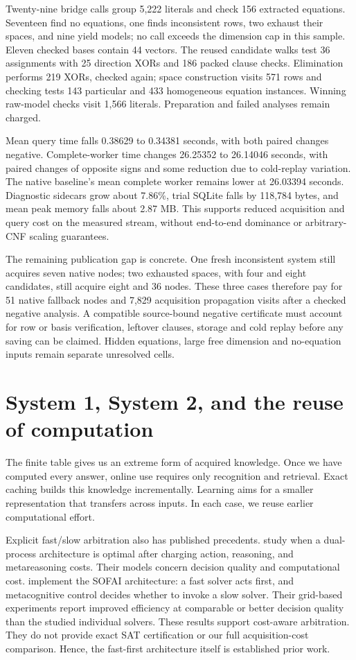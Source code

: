 \documentclass[11pt,a4paper]{article}
\numberwithin{equation}{section}
\theoremstyle{plain}
\theoremstyle{definition}
\theoremstyle{remark}
\begin{document}
Twenty-nine bridge calls group 5,222 literals and check 156 extracted equations.
Seventeen find no equations, one finds inconsistent rows, two exhaust their
spaces, and nine yield models; no call exceeds the dimension cap in this sample.
Eleven checked bases contain 44 vectors. The reused candidate walks test 36
assignments with 25 direction XORs and 186 packed clause checks. Elimination
performs 219 XORs, checked again; space construction visits 571 rows and checking
tests 143 particular and 433 homogeneous equation instances. Winning raw-model
checks visit 1,566 literals. Preparation and failed analyses remain charged.

Mean query time falls 0.38629 to 0.34381 seconds, with both paired changes
negative. Complete-worker time changes 26.25352 to 26.14046 seconds, with paired
changes of opposite signs and some reduction due to cold-replay variation.
The native baseline's mean complete worker remains lower at 26.03394 seconds.
Diagnostic sidecars grow about 7.86\%, trial SQLite falls by 118,784 bytes, and
mean peak memory falls about 2.87 MB. This supports reduced acquisition and query
cost on the measured stream, without end-to-end dominance or arbitrary-CNF
scaling guarantees.

The remaining publication gap is concrete. One fresh inconsistent system still
acquires seven native nodes; two exhausted spaces, with four and eight candidates,
still acquire eight and 36 nodes. These three cases therefore pay for 51 native
fallback nodes and 7,829 acquisition propagation visits after a checked negative
analysis. A compatible source-bound negative certificate must account for row
or basis verification, leftover clauses, storage and cold replay before any
saving can be claimed. Hidden equations, large free dimension and no-equation
inputs remain separate unresolved cells.

\section{System 1, System 2, and the reuse of computation}
\label{sec:discussion}

The finite table gives us an extreme form of acquired knowledge. Once we have computed every answer, online use requires only recognition and retrieval. Exact caching builds this knowledge incrementally. Learning aims for a smaller representation that transfers across inputs. In each case, we reuse earlier computational effort.

Explicit fast/slow arbitration also has published precedents. \citet{milli2021rational} study when a dual-process architecture is optimal after charging action, reasoning, and metareasoning costs. Their models concern decision quality and computational cost. \citet{ganapini2025sofai} implement the SOFAI architecture: a fast solver acts first, and metacognitive control decides whether to invoke a slow solver. Their grid-based experiments report improved efficiency at comparable or better decision quality than the studied individual solvers. These results support cost-aware arbitration. They do not provide exact SAT certification or our full acquisition-cost comparison. Hence, the fast-first architecture itself is established prior work.
\end{document}

